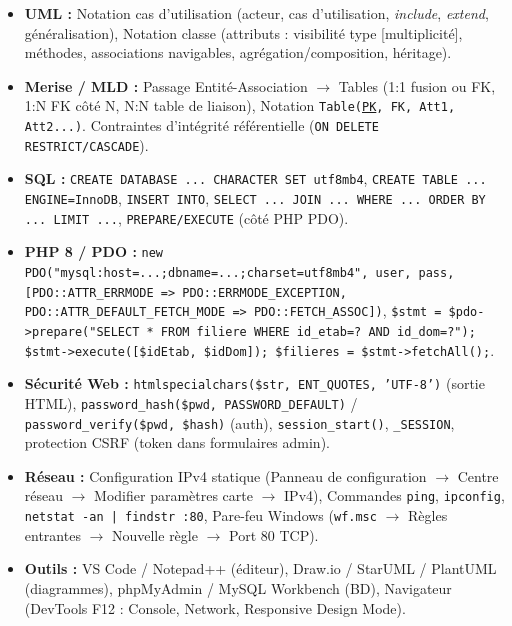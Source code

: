 \documentclass[11pt]{article}
\newcounter{popsec}
\newcounter{popsub}
\newcommand{\courssub}[1]{%
  \stepcounter{popsub}%
  \par\vspace{9pt}\noindent{\popxbold\fontsize{11.5}{13}\selectfont\color{popink}{\color{poporange}\thepopsec.\thepopsub}\hspace{6pt}#1}\par\nopagebreak\vspace{4pt}
}
\begin{document}
\courssub{Ressources à mobiliser}
\begin{itemize}
    \item \textbf{UML :} Notation cas d'utilisation (acteur, cas d'utilisation, \emph{include}, \emph{extend}, généralisation), Notation classe (attributs : visibilité type [multiplicité], méthodes, associations navigables, agrégation/composition, héritage).
    \item \textbf{Merise / MLD :} Passage Entité-Association $\to$ Tables (1:1 fusion ou FK, 1:N FK côté N, N:N table de liaison), Notation \texttt{Table(\underline{PK}, FK, Att1, Att2...)}. Contraintes d'intégrité référentielle (\texttt{ON DELETE RESTRICT/CASCADE}).
    \item \textbf{SQL :} \texttt{CREATE DATABASE ... CHARACTER SET utf8mb4}, \texttt{CREATE TABLE ... ENGINE=InnoDB}, \texttt{INSERT INTO}, \texttt{SELECT ... JOIN ... WHERE ... ORDER BY ... LIMIT ...}, \texttt{PREPARE/EXECUTE} (côté PHP PDO).
    \item \textbf{PHP 8 / PDO :} \texttt{new PDO("mysql:host=...;dbname=...;charset=utf8mb4", user, pass, [PDO::ATTR\_ERRMODE => PDO::ERRMODE\_EXCEPTION, PDO::ATTR\_DEFAULT\_FETCH\_MODE => PDO::FETCH\_ASSOC])}, \texttt{\$stmt = \$pdo->prepare("SELECT * FROM filiere WHERE id\_etab=? AND id\_dom=?"); \$stmt->execute([\$idEtab, \$idDom]); \$filieres = \$stmt->fetchAll();}.
    \item \textbf{Sécurité Web :} \texttt{htmlspecialchars(\$str, ENT\_QUOTES, 'UTF-8')} (sortie HTML), \texttt{password\_hash(\$pwd, PASSWORD\_DEFAULT)} / \texttt{password\_verify(\$pwd, \$hash)} (auth), \texttt{session\_start()}, \texttt{\_SESSION}, protection CSRF (token dans formulaires admin).
    \item \textbf{Réseau :} Configuration IPv4 statique (Panneau de configuration $\to$ Centre réseau $\to$ Modifier paramètres carte $\to$ IPv4), Commandes \texttt{ping}, \texttt{ipconfig}, \texttt{netstat -an | findstr :80}, Pare-feu Windows (\texttt{wf.msc} $\to$ Règles entrantes $\to$ Nouvelle règle $\to$ Port 80 TCP).
    \item \textbf{Outils :} VS Code / Notepad++ (éditeur), Draw.io / StarUML / PlantUML (diagrammes), phpMyAdmin / MySQL Workbench (BD), Navigateur (DevTools F12 : Console, Network, Responsive Design Mode).
\end{itemize}
\end{document}
